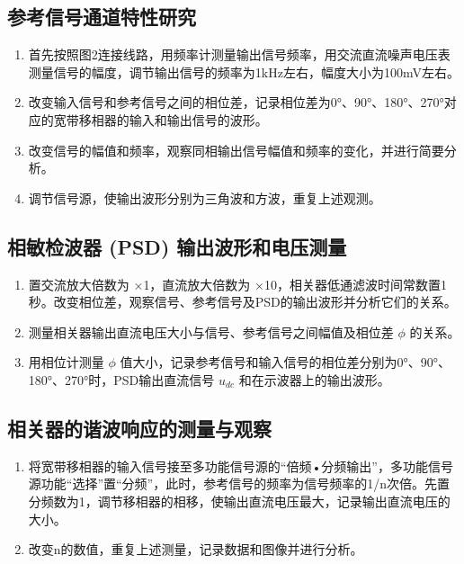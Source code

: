 \documentclass[12pt,a4paper]{article}
\begin{document}
\subsection{参考信号通道特性研究}

\begin{enumerate}
    \item 首先按照图2连接线路，用频率计测量输出信号频率，用交流直流噪声电压表测量信号的幅度，调节输出信号的频率为1kHz左右，幅度大小为100mV左右。
    \item 改变输入信号和参考信号之间的相位差，记录相位差为0°、90°、180°、270°对应的宽带移相器的输入和输出信号的波形。
    \item 改变信号的幅值和频率，观察同相输出信号幅值和频率的变化，并进行简要分析。
    \item 调节信号源，使输出波形分别为三角波和方波，重复上述观测。
\end{enumerate}

\subsection{相敏检波器 (PSD) 输出波形和电压测量}


\begin{enumerate}
    \item 置交流放大倍数为 $\times$1，直流放大倍数为 $\times$10，相关器低通滤波时间常数置1秒。改变相位差，观察信号、参考信号及PSD的输出波形并分析它们的关系。
    \item 测量相关器输出直流电压大小与信号、参考信号之间幅值及相位差 $\phi$ 的关系。
    \item 用相位计测量 $\phi$ 值大小，记录参考信号和输入信号的相位差分别为0°、90°、180°、270°时，PSD输出直流信号 $u_{dc}$ 和在示波器上的输出波形。
\end{enumerate}

\subsection{相关器的谐波响应的测量与观察}

\begin{enumerate}
    \item 将宽带移相器的输入信号接至多功能信号源的“倍频•分频输出”，多功能信号源功能“选择”置“分频”，此时，参考信号的频率为信号频率的1/n次倍。先置分频数为1，调节移相器的相移，使输出直流电压最大，记录输出直流电压的大小。
    \item 改变n的数值，重复上述测量，记录数据和图像并进行分析。
\end{enumerate}
\end{document}
